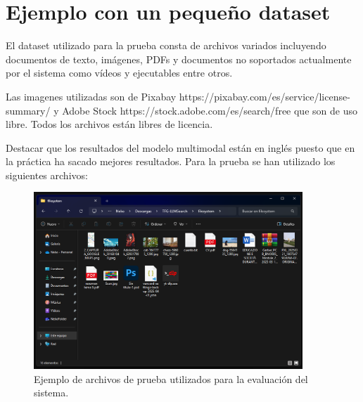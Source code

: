 \section{Ejemplo con un pequeño dataset}
\label{sec:ejemplo_dataset}
El dataset utilizado para la prueba consta de archivos variados incluyendo documentos de texto, imágenes, PDFs y documentos no soportados actualmente por el sistema como vídeos y ejecutables entre otros.

Las imagenes utilizadas son de Pixabay https://pixabay.com/es/service/license-summary/ y Adobe Stock https://stock.adobe.com/es/search/free que son de uso libre. Todos los archivos están libres de licencia.

Destacar que los resultados del modelo multimodal están en inglés puesto que en la práctica ha sacado mejores resultados.
Para la prueba se han utilizado los siguientes archivos:

\begin{figure}[H]
\centering
\includegraphics[width=0.9\textwidth]{archivos/result_files.png}
\caption[Ejemplo de archivos de prueba]{Ejemplo de archivos de prueba utilizados para la evaluación del sistema.}
\label{fig:result_files}
\end{figure}

